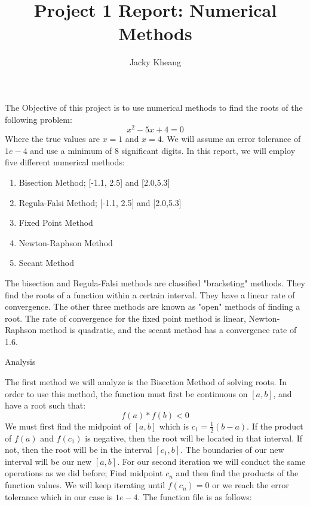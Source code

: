 \documentclass[12pt]{article}
\title{Project 1 Report: Numerical Methods}
\author{Jacky Kheang}
\begin{document}
\begin{titlepage}
\maketitle
\end{titlepage}


The Objective of this project is to use numerical methods to find the roots of the following problem:
\begin{equation*}
x^{2}-5x+4=0
\end{equation*}
Where the true values are $x=1$ and $x=4$. We will assume an error tolerance of $1e-4$ and use a minimum of 8 significant digits. In this report, we will employ five different numerical methods:
\begin{enumerate}
	\item Bisection Method; [-1.1, 2.5] and [2.0,5.3]
	\item Regula-Falsi Method; [-1.1, 2.5] and [2.0,5.3]
	\item Fixed Point Method
	\item Newton-Raphson Method
	\item Secant Method
\end{enumerate}
The bisection and Regula-Falsi methods are classified "bracketing" methods. They find the roots of a function within a certain interval. They have a linear rate of convergence. The other three methods are known as "open" methods of finding a root. The rate of convergence for the fixed point method is linear, Newton-Raphson method is quadratic, and the secant method has a convergence rate of 1.6. 
\pagebreak


\begin{center}
Analysis
\end{center}
The first method we will analyze is the Bisection Method of solving roots. In order to use this method, the function must first be continuous on $[a,b]$, and have a root such that:
\begin{equation*}
 f(a)*f(b)<0
\end{equation*}
We must first find the midpoint of $[a,b]$ which is $c_{1}=\frac{1}{2}(b-a)$. If the product of $f(a)$ and $f(c_{1})$ is negative, then the root will be located in that interval. If not, then the root will be in the interval $[c_{1},b]$. The boundaries of our new interval will be our new $[a,b]$. For our second iteration we will conduct the same operations as we did before; Find midpoint $c_{n}$ and then find the products of the function values. We will keep iterating until $f(c_{n})=0$ or we reach the error tolerance which in our case is $1e-4$. The function file is as follows:
\end{document}
